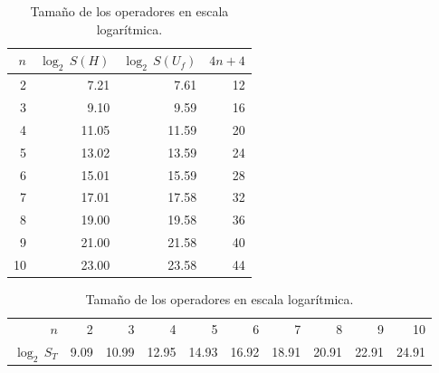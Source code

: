 \begin{ejemplo}
\begin{table}[h]
	\centering
	\begin{tabular}{*{4}{r}}
		\toprule
		$n$ & $\log_2 \, S(H)$ & $\log_2 \, S(U_f)$ & $4n+4$ \\
		\midrule
		2 	& 7.21	& 7.61	& 12\\
		3 	& 9.10	& 9.59	& 16\\
		4 	& 11.05	& 11.59	& 20\\
		5 	& 13.02	& 13.59	& 24\\
		6 	& 15.01	& 15.59	& 28\\
		7 	& 17.01	& 17.58	& 32\\
		8 	& 19.00	& 19.58	& 36\\
		9 	& 21.00	& 21.58	& 40\\
		10 	& 23.00	& 23.58	& 44\\
		\bottomrule
	\end{tabular}
	\caption{Tamaño de los operadores en escala logarítmica.}
\end{table}


\begin{table}[h]
	\centering
	\begin{tabular}{*{10}{r}}
		\toprule
$n$ & 2	& 3	& 4	& 5	& 6	& 7	& 8	& 9	& 10 \\
$\log_2 \, S_T$ & 9.09	& 10.99	& 12.95	& 14.93	& 16.92	& 18.91	& 20.91	& 22.91	
& 24.91 \\
		\bottomrule
	\end{tabular}
	\caption{Tamaño de los operadores en escala logarítmica.}
\end{table}


\end{ejemplo}



